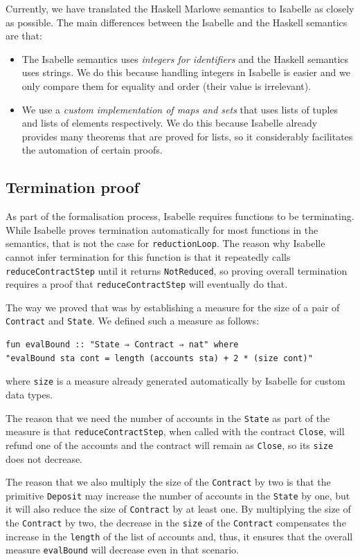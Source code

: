 \documentclass[runningheads]{llncs}
\begin{document}
Currently, we have translated the Haskell Marlowe semantics to Isabelle as closely as possible. The main differences between the Isabelle and the Haskell semantics are that:
\begin{itemize}
    \item The Isabelle semantics uses \emph{integers for identifiers} and the Haskell semantics uses strings. We do this because handling integers in Isabelle is easier and we only compare them for equality and order (their value is irrelevant).
    \item We use a \emph{custom implementation of maps and sets} that uses lists of tuples and lists of elements respectively. We do this because Isabelle already provides many theorems that are proved for lists, so it considerably facilitates the automation of certain proofs.
\end{itemize}

\subsection{Termination proof}

As part of the formalisation process, Isabelle requires functions to be terminating. While  Isabelle proves termination automatically for most functions in the semantics, that is not the case for \texttt{reductionLoop}. The reason why Isabelle cannot infer termination for this function is that it repeatedly calls \texttt{reduceContractStep} until it returns \texttt{NotReduced}, so proving overall termination  requires a proof that \texttt{reduceContractStep} will eventually do that.

The way we proved that was by establishing a measure for the size of a pair of \texttt{Contract} and \texttt{State}. We defined such a measure as follows:

\begin{verbatim}
fun evalBound :: "State ⇒ Contract ⇒ nat" where
"evalBound sta cont = length (accounts sta) + 2 * (size cont)"
\end{verbatim}
\noindent
where \texttt{size} is a measure already generated automatically by Isabelle for custom data types.

The reason that we need the number of accounts in the \texttt{State} as part of the measure is that \texttt{reduceContractStep}, when called with the contract \texttt{Close}, will refund one of the accounts and the contract will remain as \texttt{Close}, so its \texttt{size} does not decrease.

The reason that we also multiply the size of the \texttt{Contract} by two is that the primitive \texttt{Deposit} may increase the number of accounts in the \texttt{State} by one, but it will also reduce the size of \texttt{Contract} by at least one. By multiplying the size of the \texttt{Contract} by two, the decrease in the \texttt{size} of the \texttt{Contract} compensates the increase in the \texttt{length} of the list of accounts and, thus, it ensures that the overall measure \texttt{evalBound} will decrease even in that scenario.
\end{document}
